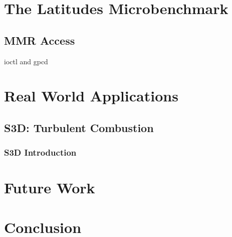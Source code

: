 \documentclass[10pt, conference, compsocconf]{IEEEtran}
\begin{document}
\section{The Latitudes Microbenchmark}

\subsection{MMR Access}
ioctl and gpcd


\section{Real World Applications}

\subsection{S3D: Turbulent Combustion}

\subsubsection{S3D Introduction}



\section{Future Work}

\section{Conclusion}





%
%
\end{document}
